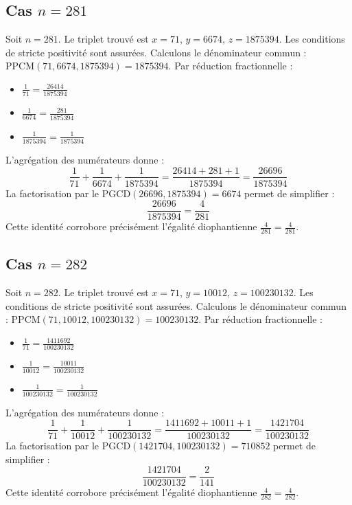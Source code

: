 \documentclass[11pt,a4paper]{article}
\begin{document}
\subsection{Cas $n = 281$}
Soit $n = 281$. Le triplet trouvé est $x = 71$, $y = 6674$, $z = 1875394$.
Les conditions de stricte positivité sont assurées.
Calculons le dénominateur commun : $\text{PPCM}(71, 6674, 1875394) = 1875394$.
Par réduction fractionnelle :
\begin{itemize}
    \item $\frac{1}{71} = \frac{26414}{1875394}$
    \item $\frac{1}{6674} = \frac{281}{1875394}$
    \item $\frac{1}{1875394} = \frac{1}{1875394}$
\end{itemize}
L'agrégation des numérateurs donne :
$$ \frac{1}{71} + \frac{1}{6674} + \frac{1}{1875394} = \frac{26414 + 281 + 1}{1875394} = \frac{26696}{1875394} $$
La factorisation par le $\text{PGCD}(26696, 1875394) = 6674$ permet de simplifier :
$$ \frac{26696}{1875394} = \frac{4}{281} $$
Cette identité corrobore précisément l'égalité diophantienne $\frac{4}{281} = \frac{4}{281}$.

\subsection{Cas $n = 282$}
Soit $n = 282$. Le triplet trouvé est $x = 71$, $y = 10012$, $z = 100230132$.
Les conditions de stricte positivité sont assurées.
Calculons le dénominateur commun : $\text{PPCM}(71, 10012, 100230132) = 100230132$.
Par réduction fractionnelle :
\begin{itemize}
    \item $\frac{1}{71} = \frac{1411692}{100230132}$
    \item $\frac{1}{10012} = \frac{10011}{100230132}$
    \item $\frac{1}{100230132} = \frac{1}{100230132}$
\end{itemize}
L'agrégation des numérateurs donne :
$$ \frac{1}{71} + \frac{1}{10012} + \frac{1}{100230132} = \frac{1411692 + 10011 + 1}{100230132} = \frac{1421704}{100230132} $$
La factorisation par le $\text{PGCD}(1421704, 100230132) = 710852$ permet de simplifier :
$$ \frac{1421704}{100230132} = \frac{2}{141} $$
Cette identité corrobore précisément l'égalité diophantienne $\frac{4}{282} = \frac{4}{282}$.
\end{document}
